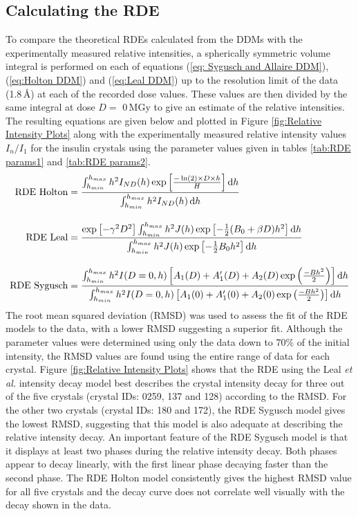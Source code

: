 \subsection{Calculating the RDE}
\label{sub:Calculating the RDE}
To compare the theoretical RDEs calculated from the DDMs with the experimentally measured relative intensities, a spherically symmetric volume integral is performed on each of equations (\ref{eq: Sygusch and Allaire DDM}), (\ref{eq:Holton DDM}) and (\ref{eq:Leal DDM}) up to the resolution limit of the data (1.8$\,$\AA) at each of the recorded dose values.
These values are then divided by the same integral at dose $D =$ 0$\,$MGy to give an estimate of the relative intensities.
The resulting equations are given below and plotted in Figure \ref{fig:Relative Intensity Plots} along with the experimentally measured relative intensity values $I_n/I_1$ for the insulin crystals using the parameter values given in tables \ref{tab:RDE params1} and \ref{tab:RDE params2}.
\begin{align}
\text{RDE Holton} &= \frac{\int^{h_{max}}_{h_{min}}{h^2 I_{ND}(h) \exp \left[ \frac{- \ln(2) \times D \times h}{H}\right]}\, \mathrm{d} h}{\int^{h_{max}}_{h_{min}}{h^2 I_{ND}(h)}\, \mathrm{d} h} \label{eqrdeholt}\\[10pt]
\text{RDE Leal} &= \frac{\exp\left[ -\gamma^2 D^2 \right] \int^{h_{max}}_{h_{min}}{h^2 J(h) \exp\left[ -\frac{1}{2}(B_0 + \beta D)h^2\right]}\, \mathrm{d} h }{\int^{h_{max}}_{h_{min}}{h^2 J(h) \exp\left[ -\frac{1}{2} B_0 h^2\right]}\, \mathrm{d} h }  \label{eqrdeleal}\\[10pt]
\text{RDE Sygusch} &= \frac{\int^{h_{max}}_{h_{min}}{h^2 I(D=0,h) \left[ A_1(D) + A'_1(D) + A_2(D) \exp\left( \frac{-B h^2}{2}\right)\right]}\, \mathrm{d} h}{\int^{h_{max}}_{h_{min}}{h^2 I(D=0,h) \left[ A_1(0) + A'_1(0) + A_2(0) \exp\left( \frac{-B h^2}{2}\right)\right]}\, \mathrm{d} h} \label{eqrdesyg}
\end{align}
The root mean squared deviation (RMSD) was used to assess the fit of the RDE models to the data, with a lower RMSD suggesting a superior fit.
Although the parameter values were determined using only the data down to 70\% of the initial intensity, the RMSD values are found using the entire range of data for each crystal.
Figure \ref{fig:Relative Intensity Plots} shows that the RDE using the Leal \textit{et al.} intensity decay model best describes the crystal intensity decay for three out of the five crystals (crystal IDs: 0259, 137 and 128) according to the RMSD.
For the other two crystals (crystal IDs: 180 and 172), the RDE Sygusch model gives the lowest RMSD, suggesting that this model is also adequate at describing the relative intensity decay.
An important feature of the RDE Sygusch model is that it displays at least two phases during the relative intensity decay.
Both phases appear to decay linearly, with the first linear phase decaying faster than the second phase.
The RDE Holton model consistently gives the highest RMSD value for all five crystals and the decay curve does not correlate well visually with the decay shown in the data.

